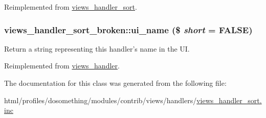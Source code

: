 Reimplemented from \hyperlink{classviews__handler__sort_aba953218e09ab9da8f6ed0a67f046455}{views\_\-handler\_\-sort}.\hypertarget{classviews__handler__sort__broken_ad83cfcffa971a65b6e306d6fac7f6c10}{
\subsubsection[{ui\_\-name}]{\setlength{\rightskip}{0pt plus 5cm}views\_\-handler\_\-sort\_\-broken::ui\_\-name (\$ {\em short} = {\ttfamily FALSE})}}
\label{classviews__handler__sort__broken_ad83cfcffa971a65b6e306d6fac7f6c10}
Return a string representing this handler's name in the UI. 

Reimplemented from \hyperlink{classviews__handler_ae81019ed08d9c3f5bca3d16c69e7b39f}{views\_\-handler}.

The documentation for this class was generated from the following file:\begin{DoxyCompactItemize}
\item 
html/profiles/dosomething/modules/contrib/views/handlers/\hyperlink{views__handler__sort_8inc}{views\_\-handler\_\-sort.inc}\end{DoxyCompactItemize}

